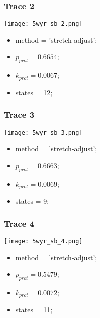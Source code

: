 \subsubsection{Trace 2}
\begin{minipage}[c]{0.7\textwidth}
    \texttt{[image: 5wyr\_sb\_2.png]}
\end{minipage}
\hfill
\begin{minipage}[c]{0.45\textwidth}
    \begin{itemize}
        \item method = 'stretch-adjust';
        \item $p_{prot}=0.6654$;
        \item $k_{prot}=0.0067$;
        \item states = 12;
    \end{itemize}
\end{minipage}

\subsubsection{Trace 3}
\begin{minipage}[c]{0.7\textwidth}
    \texttt{[image: 5wyr\_sb\_3.png]}
\end{minipage}
\hfill
\begin{minipage}[c]{0.45\textwidth}
    \begin{itemize}
        \item method = 'stretch-adjust';
        \item $p_{prot}=0.6663$;
        \item $k_{prot}=0.0069$;
        \item states = 9;
    \end{itemize}
\end{minipage}

\subsubsection{Trace 4}
\begin{minipage}[c]{0.7\textwidth}
    \texttt{[image: 5wyr\_sb\_4.png]}
\end{minipage}
\hfill
\begin{minipage}[c]{0.45\textwidth}
    \begin{itemize}
        \item method = 'stretch-adjust';
        \item $p_{prot}=0.5479$;
        \item $k_{prot}=0.0072$;
        \item states = 11;
    \end{itemize}
\end{minipage}

